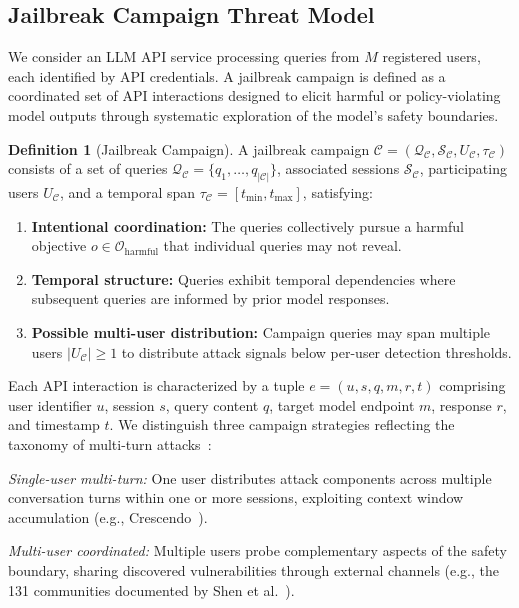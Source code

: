 \documentclass[journal]{IEEEtran}
\newcommand{\calO}{\mathcal{O}}
\newcommand{\calS}{\mathcal{S}}
\newcommand{\calC}{\mathcal{C}}
\newcommand{\calQ}{\mathcal{Q}}
\theoremstyle{plain}
\theoremstyle{definition}
\newtheorem{definition}{Definition}
\theoremstyle{remark}
\begin{document}
\subsection{Jailbreak Campaign Threat Model}

We consider an LLM API service processing queries from $M$ registered users, each identified by API credentials. A jailbreak campaign is defined as a coordinated set of API interactions designed to elicit harmful or policy-violating model outputs through systematic exploration of the model's safety boundaries.

\begin{definition}[Jailbreak Campaign]
A jailbreak campaign $\calC = (\calQ_\calC, \calS_\calC, U_\calC, \tau_\calC)$ consists of a set of queries $\calQ_\calC = \{q_1, \ldots, q_{|\calC|}\}$, associated sessions $\calS_\calC$, participating users $U_\calC$, and a temporal span $\tau_\calC = [t_{\min}, t_{\max}]$, satisfying:
\begin{enumerate}
\item \textbf{Intentional coordination:} The queries collectively pursue a harmful objective $o \in \calO_{\text{harmful}}$ that individual queries may not reveal.
\item \textbf{Temporal structure:} Queries exhibit temporal dependencies where subsequent queries are informed by prior model responses.
\item \textbf{Possible multi-user distribution:} Campaign queries may span multiple users $|U_\calC| \geq 1$ to distribute attack signals below per-user detection thresholds.
\end{enumerate}
\end{definition}

Each API interaction is characterized by a tuple $e = (u, s, q, m, r, t)$ comprising user identifier $u$, session $s$, query content $q$, target model endpoint $m$, response $r$, and timestamp $t$. We distinguish three campaign strategies reflecting the taxonomy of multi-turn attacks~\cite{li2024mhj, russinovich2024crescendo}:

\textit{Single-user multi-turn:} One user distributes attack components across multiple conversation turns within one or more sessions, exploiting context window accumulation (e.g., Crescendo~\cite{russinovich2024crescendo}).

\textit{Multi-user coordinated:} Multiple users probe complementary aspects of the safety boundary, sharing discovered vulnerabilities through external channels (e.g., the 131 communities documented by Shen et al.~\cite{shen2024dan}).
\end{document}
